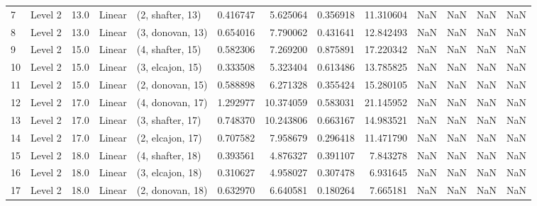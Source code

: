 \begin{tabular}{llrllrrrrrrrr}
7  &   Level 2 &   13.0 &      Linear &  (2, shafter, 13) &   0.416747 &   5.625064 &  0.356918 &  11.310604 &                  NaN &                    NaN &                 NaN &                   NaN \\
8  &   Level 2 &   13.0 &      Linear &  (3, donovan, 13) &   0.654016 &   7.790062 &  0.431641 &  12.842493 &                  NaN &                    NaN &                 NaN &                   NaN \\
9  &   Level 2 &   15.0 &      Linear &  (4, shafter, 15) &   0.582306 &   7.269200 &  0.875891 &  17.220342 &                  NaN &                    NaN &                 NaN &                   NaN \\
10 &   Level 2 &   15.0 &      Linear &  (3, elcajon, 15) &   0.333508 &   5.323404 &  0.613486 &  13.785825 &                  NaN &                    NaN &                 NaN &                   NaN \\
11 &   Level 2 &   15.0 &      Linear &  (2, donovan, 15) &   0.588898 &   6.271328 &  0.355424 &  15.280105 &                  NaN &                    NaN &                 NaN &                   NaN \\
12 &   Level 2 &   17.0 &      Linear &  (4, donovan, 17) &   1.292977 &  10.374059 &  0.583031 &  21.145952 &                  NaN &                    NaN &                 NaN &                   NaN \\
13 &   Level 2 &   17.0 &      Linear &  (3, shafter, 17) &   0.748370 &  10.243806 &  0.663167 &  14.983521 &                  NaN &                    NaN &                 NaN &                   NaN \\
14 &   Level 2 &   17.0 &      Linear &  (2, elcajon, 17) &   0.707582 &   7.958679 &  0.296418 &  11.471790 &                  NaN &                    NaN &                 NaN &                   NaN \\
15 &   Level 2 &   18.0 &      Linear &  (4, shafter, 18) &   0.393561 &   4.876327 &  0.391107 &   7.843278 &                  NaN &                    NaN &                 NaN &                   NaN \\
16 &   Level 2 &   18.0 &      Linear &  (3, elcajon, 18) &   0.310627 &   4.958027 &  0.307478 &   6.931645 &                  NaN &                    NaN &                 NaN &                   NaN \\
17 &   Level 2 &   18.0 &      Linear &  (2, donovan, 18) &   0.632970 &   6.640581 &  0.180264 &   7.665181 &                  NaN &                    NaN &                 NaN &                   NaN \\

\end{tabular}
